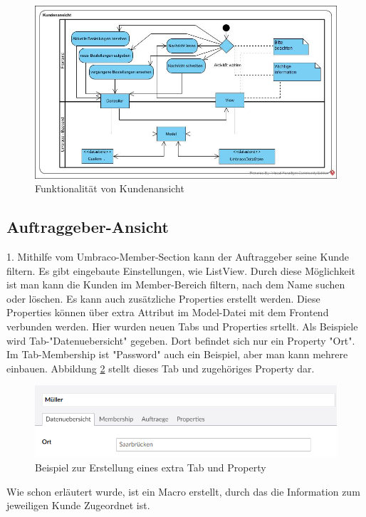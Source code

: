 \begin{figure}[h]
	\centering
	\includegraphics[width=1\linewidth]{Graphics/KundenansichtNeu.jpg}
	\caption[Funktionalität von Kundenansicht]{Funktionalität von Kundenansicht}
	\label{fig:KundenansichtNeu}
\end{figure}

\subsection{Auftraggeber-Ansicht}
  
1. Mithilfe vom Umbraco-Member-Section kann der Auftraggeber seine Kunde filtern. Es gibt eingebaute Einstellungen, wie ListView. Durch diese Möglichkeit ist man kann die Kunden im Member-Bereich filtern, nach dem Name suchen oder löschen. Es kann auch zusätzliche Properties erstellt werden. Diese Properties können über extra Attribut im Model-Datei mit dem Frontend verbunden werden.
Hier wurden neuen Tabs und Properties srtellt. Als Beispiele wird Tab-"Datenuebersicht" gegeben. Dort befindet sich nur ein Property "Ort". Im Tab-Membership ist "Password" auch ein Beispiel, aber man kann mehrere einbauen. Abbildung \ref{fig:auftraggeberAnsichtDaten} stellt dieses Tab und zugehöriges Property dar.

\begin{figure}[h]
	\centering
	\includegraphics[width=1\linewidth]{Graphics/auftraggeberAnsichtDaten.png}
	\caption[Kundeansicht]{Beispiel zur Erstellung eines extra Tab und Property}
	\label{fig:auftraggeberAnsichtDaten}
\end{figure}
 Wie schon erläutert wurde, ist ein Macro erstellt, durch das die Information zum jeweiligen Kunde Zugeordnet ist. 

